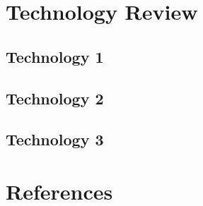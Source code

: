 \section{Technology Review}

\subsection{Technology 1}

\subsection{Technology 2}

\subsection{Technology 3}

\clearpage
\section{References}

\cite{icu}
\cite{xerces}
\cite{xalan}




\clearpage
